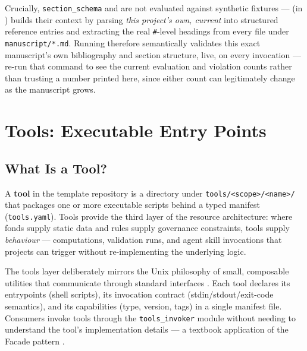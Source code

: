 \documentclass[
]{article}
\begin{document}
Crucially, \texttt{section\_schema} and  are
not evaluated against synthetic fixtures ---
 (in
) builds their context by
parsing \emph{this project's own, current}
 into structured reference entries and
extracting the real \texttt{\#}-level headings from every file under
\texttt{manuscript/*.md}. Running
therefore semantically validates this exact manuscript's own
bibliography and section structure, live, on every invocation --- re-run
that command to see the current evaluation and violation counts rather
than trusting a number printed here, since either count can legitimately
change as the manuscript grows.

\newpage

\section{Tools: Executable Entry Points}\label{sec:tools}

\subsection{What Is a Tool?}\label{what-is-a-tool}

A \textbf{tool} in the template repository is a directory under
\texttt{tools/\textless{}scope\textgreater{}/\textless{}name\textgreater{}/}
that packages one or more executable scripts behind a typed manifest
(\texttt{tools.yaml}). Tools provide the third layer of the resource
architecture: where fonds supply static data and rules supply governance
constraints, tools supply \emph{behaviour} --- computations, validation
runs, and agent skill invocations that projects can trigger without
re-implementing the underlying logic.

The tools layer deliberately mirrors the Unix philosophy of small,
composable utilities that communicate through standard interfaces
\citep{Raymond2003art}. Each tool declares its entrypoints (shell
scripts), its invocation contract (stdin/stdout/exit-code semantics),
and its capabilities (type, version, tags) in a single manifest file.
Consumers invoke tools through the \texttt{tools\_invoker} module
without needing to understand the tool's implementation details --- a
textbook application of the Facade pattern \citep{Gamma1994design}.
\end{document}
